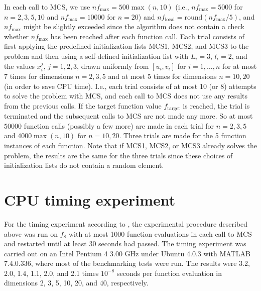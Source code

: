 \documentclass{sig-alternate}
\begin{document}
In each call to MCS, we use $nf_{\max} = 500\max(n,10)$ (i.e., $nf_{\max} = 5000$
for $n=2, 3, 5, 10$ and $nf_{\max} = 10000$ for $n=20$) and $nf_\text{local} = 
\text{round}(nf_{\max}/5)$, and $nf_{\max}$ might be slightly exceeded since the
algorithm does not contain a check whether $nf_{\max}$ has been reached after each
function call. Each trial consists of first applying the predefined initialization
lists MCS1, MCS2, and MCS3 to the problem and then using a self-defined 
initialization list with $L_i = 3$, $l_i = 2$, and the values $x_i^j$, $j=1,2,3$, 
drawn uniformly from $[u_i,v_i]$ for $i=1,\dots,n$ for at most 7 times for 
dimensions $n=2,3,5$ and at most 5 times for dimensions $n=10,20$ (in order to save
CPU time). I.e., each trial consists of at most 10 (or 8) attempts to solve the
problem with MCS, and each call to MCS does not use any results from the previous
calls. If the target function value $f_\text{target}$ is reached, the trial is
terminated and the subsequent calls to MCS are not made any more. So at most
$50000$ function calls (possibly a few more) are made in each trial for $n=2,3,5$
and $4000\max(n,10)$ for $n=10,20$.
Three trials are made for the 5 function instances of each function. Note that
if MCS1, 
MCS2, or MCS3 already solves the problem, the results are the same for the three 
trials since these choices of initialization lists do not contain a random element. 

\section{CPU timing experiment}

For the timing experiment according to \cite{hansen2009exp},
the experimental procedure described above was run on $f_8$
with at most 1000 function evaluations in each call to MCS and restarted until 
at least 30 seconds had passed. The timing experiment was carried out on an Intel
Pentium 4 3.00 GHz under Ubuntu 4.0.3 with MATLAB 7.4.0.336, where most of the
benchmarking tests were run. The results were
3.2, 2.0, 1.4, 1.1, 2.0, and 2.1 times $10^{-8}$ seconds per function evaluation
in dimensions 2, 3, 5, 10, 20, and 40, respectively.



\end{document}
